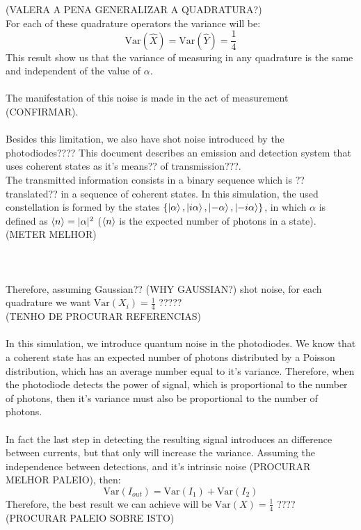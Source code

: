 (VALERA A PENA GENERALIZAR A QUADRATURA?)\\
For each of these quadrature operators the variance will be:
$$
\textrm{Var}(\hat{X}) = \textrm{Var}(\hat{Y}) = \frac{1}{4}
$$
This result show us that the variance of measuring in any quadrature is the same and independent of the value of $\alpha$.\\
\\
The manifestation of this noise is made in the act of measurement (CONFIRMAR).\\
\\
Besides this limitation, we also have shot noise introduced by the photodiodes????
%
%
%
%
This document describes an emission and detection system that uses coherent states as it's means?? of transmission???.\\
The transmitted information consists in a binary sequence which is ??translated?? in a sequence of coherent states. In this simulation, the used constellation is formed by the states $\{ \ket{\alpha}, \ket{i\alpha}, \ket{ - \alpha}, \ket{ - i \alpha} \}$, in which $\alpha$ is defined as $\braket{n} = |\alpha|^2$ ($\braket{n}$ is the expected number of photons in a state). (METER MELHOR) \\
\\
\\
\\
Therefore, assuming Gaussian?? (WHY GAUSSIAN?) shot noise, for each quadrature we want $\textrm{Var}(X_i) = \frac{1}{4}$ ?????\\
(TENHO DE PROCURAR REFERENCIAS)
\\
\\
In this simulation, we introduce quantum noise in the photodiodes.
We know that a coherent state has an expected number of photons distributed by a Poisson distribution, which has an average number equal to it's variance. Therefore, when the photodiode detects the power of signal, which is proportional to the number of photons, then it's variance must also be proportional to the number of photons.\\
\\
In fact the last step in detecting the resulting signal introduces an difference between currents, but that only will increase the variance. Assuming the independence between detections, and it's intrinsic noise (PROCURAR MELHOR PALEIO), then:
$$
\textrm{Var}(I_{out}) = \textrm{Var}(I_1) + \textrm{Var}(I_2)
$$
Therefore, the best result we can achieve will be $\textrm{Var}(X) = \frac{1}{4}$ ???? (PROCURAR PALEIO SOBRE ISTO)\\
\\
\\

